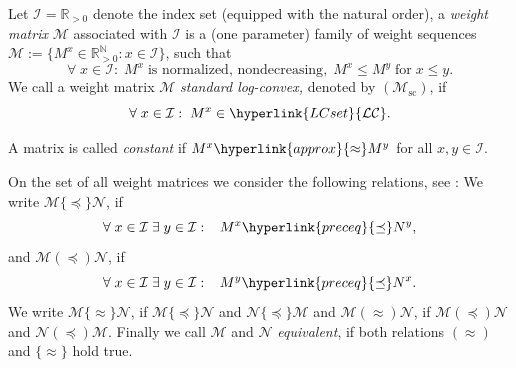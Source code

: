 \documentclass[10pt]{amsart}%
\numberwithin{equation}{section}
\theoremstyle{plain}
\newcommand{\RR}{\mathbb{R}}
\newcommand{\NN}{\mathbb{N}}
\let\on=\operatorname
\begin{document}
Let $\mathcal{I}=\RR_{>0}$ denote the index set (equipped with the natural order), a {\itshape weight matrix} $\mathcal{M}$ associated with $\mathcal{I}$ is a (one parameter) family of weight sequences $\mathcal{M}:=\{M^x\in\RR_{>0}^{\NN}: x\in\mathcal{I}\}$, such that
$$\forall\;x\in\mathcal{I}:\;M^x\;\text{is normalized, nondecreasing},\;M^{x}\le M^{y}\;\text{for}\;x\le y.$$
We call a weight matrix $\mathcal{M}$ {\itshape standard log-convex,} denoted by \hypertarget{Msc}{$(\mathcal{M}_{\on{sc}})$}, if
$$\forall\;x\in\mathcal{I}:\;M^x\in\hyperlink{LCset}{\mathcal{LC}}.$$

A matrix is called {\itshape constant} if $M^x\hyperlink{approx}{\approx}M^y$ for all $x,y\in\mathcal{I}$.\vspace{6pt}

On the set of all weight matrices we consider the following relations, see \cite[p. 111]{compositionpaper}: We write $\mathcal{M}\{\preceq\}\mathcal{N}$, if
$$\forall\;x\in\mathcal{I}\;\exists\;y\in\mathcal{I}:\;\;\;M^x\hyperlink{preceq}{\preceq}N^y,$$
and
$\mathcal{M}(\preceq)\mathcal{N}$, if
$$\forall\;x\in\mathcal{I}\;\exists\;y\in\mathcal{I}:\;\;\;M^y\hyperlink{preceq}{\preceq}N^x.$$
We write $\mathcal{M}\{\approx\}\mathcal{N}$, if $\mathcal{M}\{\preceq\}\mathcal{N}$ and $\mathcal{N}\{\preceq\}\mathcal{M}$ and $\mathcal{M}(\approx)\mathcal{N}$, if $\mathcal{M}(\preceq)\mathcal{N}$ and $\mathcal{N}(\preceq)\mathcal{M}$. Finally we call $\mathcal{M}$ and $\mathcal{N}$ {\itshape equivalent}, if both relations $(\approx)$ and $\{\approx\}$ hold true.
\end{document}
